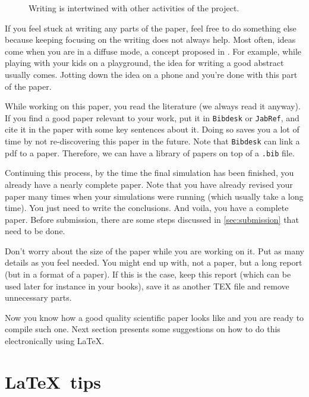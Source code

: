 \documentclass[authoryear,3p,times,preprint,review,fleqn]{elsarticle}
\numberwithin{equation}{section}
\theoremstyle{remark}
\begin{document}
 \begin{figure}[!ht]
      \centering
      \caption{Writing is intertwined with other activities of the project.}
      \label{fig:writing}
    \end{figure}

If you feel stuck at writing any parts of the paper, feel free to do something else because keeping focusing on the writing does not always help. Most often, ideas come when you are in a diffuse mode, a concept proposed in \cite{Oakley:2018a}. For example, while playing with your kids on a playground, the idea for writing a good abstract usually comes. Jotting down the idea on a phone and you're done with this part of the paper.

While working on this paper, you read the literature (we always read it anyway). If you find a good paper relevant to your work, put it in \texttt{Bibdesk} or \texttt{JabRef}, and cite it in the paper with some key sentences about it. Doing so saves you a lot of time by not re-discovering this paper in the future. Note that \texttt{Bibdesk} can link a pdf to a paper. Therefore, we can have a library of papers on top of a \texttt{.bib} file. 

Continuing this process, by the time the final simulation has been finished, you already have a nearly complete paper. Note that you have already revised your paper many times when your simulations were running (which usually take a long time).
You just need to write the conclusions. And voila, you have a complete paper. Before submission, there are some steps discussed in \cref{sec:submission} that need to be done.

Don't worry about the size of the paper while you are working on it. Put as many details as you feel needed. You might end up with, not a paper, but a long report (but in a format of a paper). If this is the case, keep this report (which can be used later for instance in your books), save it as another TEX file and remove unnecessary parts.

Now you know how a good quality scientific paper looks like and you are ready to compile such one. Next section presents some suggestions on how to do this electronically using \LaTeX. \\

% 


\section{\LaTeX\ tips}\label{sec:latex}
\end{document}
